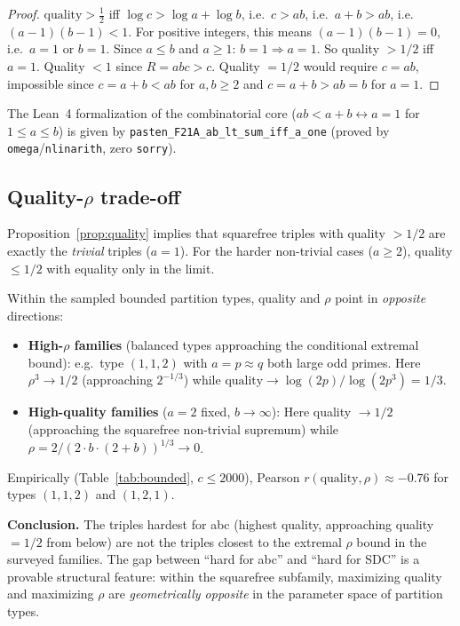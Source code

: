 \documentclass[12pt]{article}
\theoremstyle{definition}
\begin{document}
\begin{proof}
$\mathrm{quality} > \tfrac{1}{2}$ iff $\log c > \log a + \log b$, i.e.\ $c > ab$,
i.e.\ $a + b > ab$, i.e.\ $(a-1)(b-1) < 1$.  For positive integers, this means
$(a-1)(b-1) = 0$, i.e.\ $a = 1$ or $b = 1$.  Since $a \le b$ and $a \ge 1$:
$b = 1 \Rightarrow a = 1$.  So quality $> 1/2$ iff $a = 1$.
Quality $< 1$ since $R = abc > c$.  Quality $= 1/2$ would require $c = ab$, impossible
since $c = a + b < ab$ for $a, b \ge 2$ and $c = a + b > ab = b$ for $a = 1$.
\end{proof}

The Lean~4 formalization of the combinatorial core ($ab < a+b \leftrightarrow a=1$ for
$1 \le a \le b$) is given by \texttt{pasten\_F21A\_ab\_lt\_sum\_iff\_a\_one}
(proved by \texttt{omega}/\texttt{nlinarith}, zero \texttt{sorry}).

\subsection{Quality-$\rho$ trade-off}

Proposition~\ref{prop:quality} implies that squarefree triples with quality $> 1/2$
are exactly the \emph{trivial} triples ($a = 1$).  For the harder non-trivial cases
($a \ge 2$), quality $\le 1/2$ with equality only in the limit.

Within the sampled bounded partition types, quality and $\rho$ point in
\emph{opposite} directions:
\begin{itemize}
  \item \textbf{High-$\rho$ families} (balanced types approaching the conditional extremal bound):
    e.g.\ type $(1,1,2)$ with $a = p \approx q$ both large odd primes.
    Here $\rho^3 \to 1/2$ (approaching $2^{-1/3}$) while
    $\text{quality} \to \log(2p)/\log(2p^3) = 1/3$.
  \item \textbf{High-quality families} ($a=2$ fixed, $b\to\infty$):
    Here quality $\to 1/2$ (approaching the squarefree non-trivial supremum) while
    $\rho = 2/(2 \cdot b \cdot (2+b))^{1/3} \to 0$.
\end{itemize}
Empirically (Table~\ref{tab:bounded}, $c \le 2000$), Pearson $r(\text{quality}, \rho) \approx -0.76$
for types $(1,1,2)$ and $(1,2,1)$.

\textbf{Conclusion.}  The triples hardest for abc (highest quality, approaching
quality $= 1/2$ from below) are not the triples closest to the extremal $\rho$
bound in the surveyed families.
The gap between ``hard for abc'' and ``hard for SDC'' is a provable structural feature:
within the squarefree subfamily, maximizing quality and maximizing $\rho$ are
\emph{geometrically opposite} in the parameter space of partition types.
\end{document}
